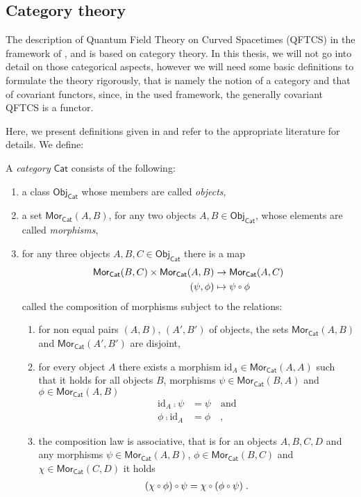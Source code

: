 \subsection{Category theory}\label{sec:cat-theory}
The description of Quantum Field Theory on Curved Spacetimes (QFTCS) in the framework of ,  and  \cite{Brunetti_Fredenhagen_Verch} is based on category theory. In this thesis, we will not go into detail on those categorical aspects, however we will need some basic definitions to formulate the theory rigorously, that is namely the notion of a category and that of covariant functors, since, in the used framework, the generally covariant QFTCS is a functor.\par
Here, we present definitions given in \cite[Appendix A.1]{baer_ginoux_pfaeffle} and refer to the appropriate literature for details. We define:
\begin{definition}[Category]
	A \emph{category} $\mathsf{Cat}$ consists of the following:
	\begin{enumerate}
		\item a class $\mathsf{Obj}_\mathsf{Cat}$ whose members are called \emph{objects},
		\item a set $\mathsf{Mor}_\mathsf{Cat}(A,B)$, for any two objects $A,B \in \mathsf{Obj}_\mathsf{Cat}$, whose elements are called \emph{morphisms},
		\item for any three objects $A,B,C \in \mathsf{Obj}_\mathsf{Cat}$ there is a map
		\begin{align}
\mathsf{Mor}_\mathsf{Cat}(B,C) \times \mathsf{Mor}_\mathsf{Cat}(A,B) &\to \mathsf{Mor}_\mathsf{Cat}(A,C) \notag\\
(\psi,\phi) &\mapsto \psi \comp \phi
		\end{align}
		called the composition of morphisms subject to the relations:\vspace{4mm}
		\begin{enumerate}[label=(\arabic*)]
			\item for non equal pairs $(A,B)$, $(A',B')$ of objects, the sets $\mathsf{Mor}_\mathsf{Cat}(A,B)$ and $\mathsf{Mor}_\mathsf{Cat}(A',B')$ are disjoint,
			\item for every object $A$ there exists a morphism $\text{id}_A \in \mathsf{Mor}_\mathsf{Cat}(A,A)$ such that it holds for all objects $B$, morphisms $\psi \in \mathsf{Mor}_\mathsf{Cat}(B,A)$ and $\phi \in \mathsf{Mor}_\mathsf{Cat}(A,B)$
			\begin{align}
				\text{id}_A \comp \psi &= \psi \quad \text{and}\\
				\phi \comp \text{id}_A &= \phi \quad,
			\end{align}
			\item the composition law is associative, that is for an objects $A,B,C,D$ and any morphisms $\psi \in \mathsf{Mor}_\mathsf{Cat}(A,B)$, $\phi \in \mathsf{Mor}_\mathsf{Cat}(B,C)$ and $\chi \in \mathsf{Mor}_\mathsf{Cat}(C,D)$ it holds
			\begin{align}
				(\chi \comp \phi) \comp \psi = \chi \comp (\phi \comp \psi) \formspace.
			\end{align}
		\end{enumerate}
	\end{enumerate}
\end{definition}
